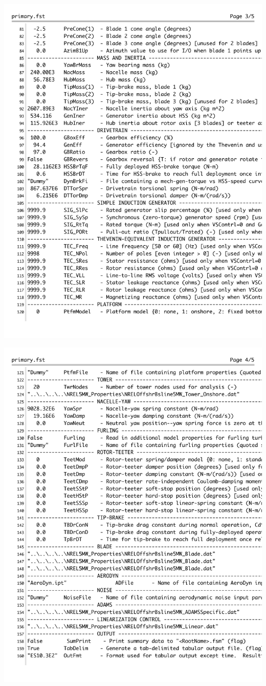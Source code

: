 \includegraphics[width=.95\linewidth]{Figures/AppendixAFigures/primaryP4.pdf}	

\includegraphics[width=.95\linewidth]{Figures/AppendixAFigures/primaryP5.pdf}	



